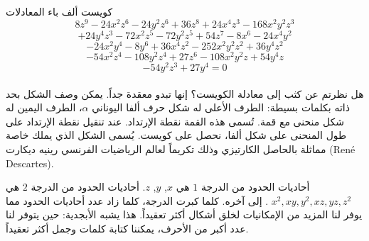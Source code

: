 \begin{surferPage}[ويست]{كويست }
ألف باء المعادلات
  \smallskip
\[8z^9-24x^2z^6-24y^2z^6+36z^8+24x^4z^3-168x^2y^2z^3\]
\[+24y^4z^3-72x^2z^5-72y^2z^5+54z^7-8x^6-24x^4y^2\]
\[-24x^2y^4-8y^6 + 36x^4z^2-252x^2y^2z^2+36y^4z^2\]
\[- 54x^2z^4-108y^2z^4 + 27z^6-108x^2y^2z + 54y^4z\]
\[-54y^2z^3 + 27y^4 = 0\]\\
\vspace{0.3cm}
هل نظرتم عن كثب إلى معادلة الكويست؟ إنها تبدو معقدة جداً.
يمكن وصف الشكل بحد ذاته بكلمات بسيطة: الطرف الأعلى له شكل حرف ألفا اليوناني $\alpha$، الطرف اليمين له شكل منحنى مع قمة. تُسمى هذه القمة نقطة الإرتداد. عند تنقيل نقطة الإرتداد على طول المنحنى على شكل ألفا، نحصل على كويست. يُسمى الشكل الذي يملك خاصة مماثلة  بالحاصل الكارتيزي وذلك تكريماً لعالم الرياضيات الفرنسي رينيه ديكارت \textenglish{(Ren\'e Descartes)}.

\vspace{0.3cm}
أحاديات الحدود من الدرجة $1$ هي $x$, $y$, $z$. أحاديات الحدود من الدرجة $2$ هي
 $x^2, xy, y^2, xz, yz, z^2$  
. إلى آخره. كلما كبرت الدرجة، كلما زاد عدد أحاديات الحدود مما يوفر لنا المزيد من الإمكانيات لخلق أشكال أكثر تعقيداً. هذا يشبه الأبجدية: حين يتوفر لنا عدد أكبر من الأحرف، يمكننا كتابة كلمات وجمل أكثر تعقيداً.
\end{surferPage}
